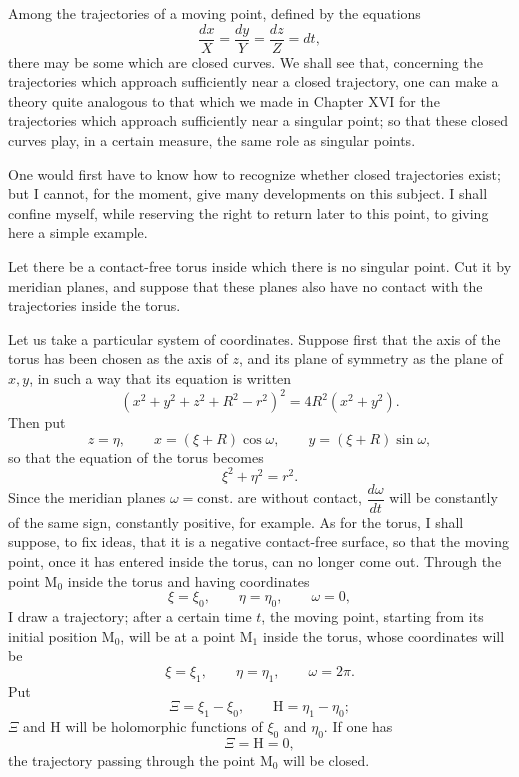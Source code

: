 \documentclass[11pt]{article}
\begin{document}
Among the trajectories of a moving point, defined by the equations
\[
\frac{dx}{X}=\frac{dy}{Y}=\frac{dz}{Z}=dt,
\]
there may be some which are closed curves. We shall see that, concerning the trajectories which approach sufficiently near a closed trajectory, one can make a theory quite analogous to that which we made in Chapter XVI for the trajectories which approach sufficiently near a singular point; so that these closed curves play, in a certain measure, the same role as singular points.

One would first have to know how to recognize whether closed trajectories exist; but I cannot, for the moment, give many developments on this subject. I shall confine myself, while reserving the right to return later to this point, to giving here a simple example.

Let there be a contact-free torus inside which there is no singular point. Cut it by meridian planes, and suppose that these planes also have no contact with the trajectories inside the torus.

Let us take a particular system of coordinates. Suppose first that the axis of the torus has been chosen as the axis of $z$, and its plane of symmetry as the plane of $x,y$, in such a way that its equation is written
\[
\left(x^2+y^2+z^2+R^2-r^2\right)^2=4R^2(x^2+y^2).
\]
Then put
\[
z=\eta,
\qquad x=(\xi+R)\cos\omega,
\qquad y=(\xi+R)\sin\omega,
\]
so that the equation of the torus becomes
\[
\xi^2+\eta^2=r^2.
\]
Since the meridian planes $\omega=\mathrm{const.}$ are without contact, $\dfrac{d\omega}{dt}$ will be constantly of the same sign, constantly positive, for example. As for the torus, I shall suppose, to fix ideas, that it is a negative contact-free surface, so that the moving point, once it has entered inside the torus, can no longer come out. Through the point $\mathrm{M}_0$ inside the torus and having coordinates
\[
\xi=\xi_0,
\qquad \eta=\eta_0,
\qquad \omega=0,
\]
I draw a trajectory; after a certain time $t$, the moving point, starting from its initial position $\mathrm{M}_0$, will be at a point $\mathrm{M}_1$ inside the torus, whose coordinates will be
\[
\xi=\xi_1,
\qquad \eta=\eta_1,
\qquad \omega=2\pi.
\]
Put
\[
\Xi=\xi_1-\xi_0,
\qquad \mathrm{H}=\eta_1-\eta_0;
\]
$\Xi$ and $\mathrm{H}$ will be holomorphic functions of $\xi_0$ and $\eta_0$. If one has
\[
\Xi=\mathrm{H}=0,
\]
the trajectory passing through the point $\mathrm{M}_0$ will be closed.
\end{document}
